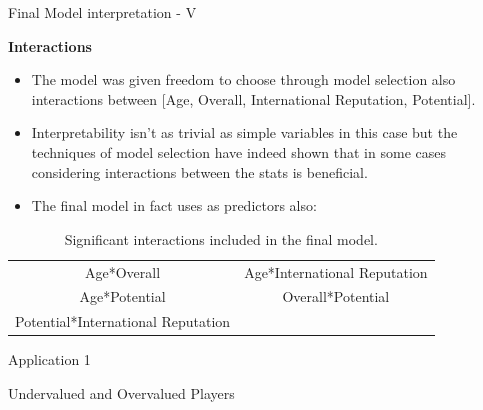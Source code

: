 \documentclass[aspectratio=169,xcolor=dvipsnames]{beamer}
\begin{document}
\begin{frame}{Final Model interpretation - V}

\vspace{5mm}

\begin{large}
\begin{center}
\textbf{Interactions}
\end{center}
\end{large}

\vspace{5mm}

\begin{itemize}
\item The model was given freedom to choose through model selection also interactions between [Age, Overall, International Reputation, Potential]. 


\item Interpretability isn't as trivial as simple variables in this case but the techniques of model selection have indeed shown that in some cases considering interactions between the stats is beneficial. 

\item The final model in fact uses as predictors also:
\end{itemize}

\begin{table}[ht]
\centering
\begin{tabular}{cc}
  \hline
    Age*Overall &   Age*International Reputation \\ 
    Age*Potential   &   Overall*Potential\\ 
    Potential*International Reputation \\
   \hline
\end{tabular}
\caption{Significant interactions included in the final model.}
\end{table}
\end{frame}


\begin{frame}{}
    \centering
    \begin{Large}
    Application 1\\
    \end{Large}
    \vspace{0.5cm}
    \begin{Huge}
    Undervalued and Overvalued Players
    \end{Huge}
\end{frame}
\end{document}
